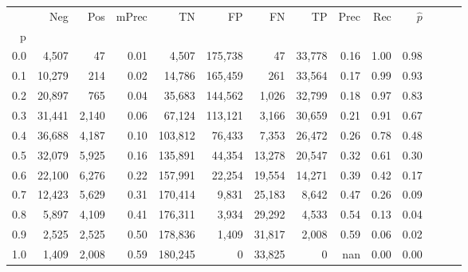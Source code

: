 \begin{tabular}{rrrrrrrrrrrrrr}
\toprule
{} &     Neg &    Pos & mPrec &       TN &       FP &      FN &      TP &  Prec &   Rec & $\hat{p}$ \\
p   &         &        &       &          &          &         &         &       &       &           \\
\midrule
0.0 &   4,507 &     47 &  0.01 &    4,507 &  175,738 &      47 &  33,778 &  0.16 &  1.00 &      0.98 \\
0.1 &  10,279 &    214 &  0.02 &   14,786 &  165,459 &     261 &  33,564 &  0.17 &  0.99 &      0.93 \\
0.2 &  20,897 &    765 &  0.04 &   35,683 &  144,562 &   1,026 &  32,799 &  0.18 &  0.97 &      0.83 \\
0.3 &  31,441 &  2,140 &  0.06 &   67,124 &  113,121 &   3,166 &  30,659 &  0.21 &  0.91 &      0.67 \\
0.4 &  36,688 &  4,187 &  0.10 &  103,812 &   76,433 &   7,353 &  26,472 &  0.26 &  0.78 &      0.48 \\
0.5 &  32,079 &  5,925 &  0.16 &  135,891 &   44,354 &  13,278 &  20,547 &  0.32 &  0.61 &      0.30 \\
0.6 &  22,100 &  6,276 &  0.22 &  157,991 &   22,254 &  19,554 &  14,271 &  0.39 &  0.42 &      0.17 \\
0.7 &  12,423 &  5,629 &  0.31 &  170,414 &    9,831 &  25,183 &   8,642 &  0.47 &  0.26 &      0.09 \\
0.8 &   5,897 &  4,109 &  0.41 &  176,311 &    3,934 &  29,292 &   4,533 &  0.54 &  0.13 &      0.04 \\
0.9 &   2,525 &  2,525 &  0.50 &  178,836 &    1,409 &  31,817 &   2,008 &  0.59 &  0.06 &      0.02 \\
1.0 &   1,409 &  2,008 &  0.59 &  180,245 &        0 &  33,825 &       0 &   nan &  0.00 &      0.00 \\
\bottomrule
\end{tabular}

